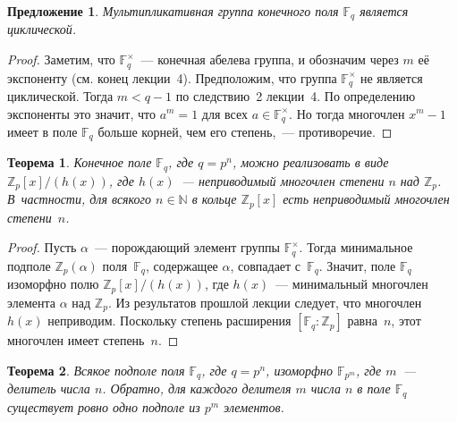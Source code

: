 \documentclass[a4paper,10pt]{amsart}
\def\FF{{\mathbb F}}%
\def\ZZ{{\mathbb Z}}%
\def\NN{{\mathbb N}}%
\newtheorem{theorem}{Теорема}
\newtheorem{proposition}{Предложение}
\theoremstyle{definition}
\theoremstyle{remark}
\begin{document}
\begin{proposition}
Мультипликативная группа конечного поля $\FF_q$ является
циклической.
\end{proposition}

\begin{proof}
Заметим, что $\FF_q^\times$~--- конечная абелева группа, и обозначим
через $m$ её экспоненту (см. конец лекции~4). Предположим, что
группа $\FF_q^{\times}$ не является циклической. Тогда $m < q-1$ по
следствию~2 лекции~4. По определению экспоненты это значит, что $a^m
= 1$ для всех $a \in \FF_q^{\times}$. Но тогда многочлен $x^m-1$
имеет в поле $\FF_q$ больше корней, чем его степень,~---
противоречие.
\end{proof}

\begin{theorem}
Конечное поле $\FF_q$, где $q=p^n$, можно реализовать в виде
$\ZZ_p[x]/(h(x))$, где $h(x)$~--- неприводимый многочлен степени $n$
над $\ZZ_p$. В~частности, для всякого $n \in \NN$ в кольце
$\ZZ_p[x]$ есть неприводимый многочлен степени~$n$.
\end{theorem}

\begin{proof}
Пусть $\alpha$~--- порождающий элемент группы $\FF_q^{\times}$.
Тогда минимальное подполе $\ZZ_p(\alpha)$ поля~$\FF_q$, содержащее
$\alpha$, совпадает с~$\FF_q$. Значит, поле $\FF_q$ изоморфно полю
$\ZZ_p[x]/(h(x))$, где $h(x)$~--- минимальный многочлен элемента
$\alpha$ над $\ZZ_p$. Из результатов прошлой лекции следует, что
многочлен $h(x)$ неприводим. Поскольку степень расширения $[\FF_q :
\ZZ_p]$ равна~$n$, этот многочлен имеет степень~$n$.
\end{proof}

\begin{theorem}
Всякое подполе поля $\FF_q$, где $q=p^n$, изоморфно $\FF_{p^m}$, где
$m$~--- делитель числа $n$. Обратно, для каждого делителя $m$ числа
$n$ в поле $\FF_q$ существует ровно одно подполе из $p^m$ элементов.
\end{theorem}
\end{document}
